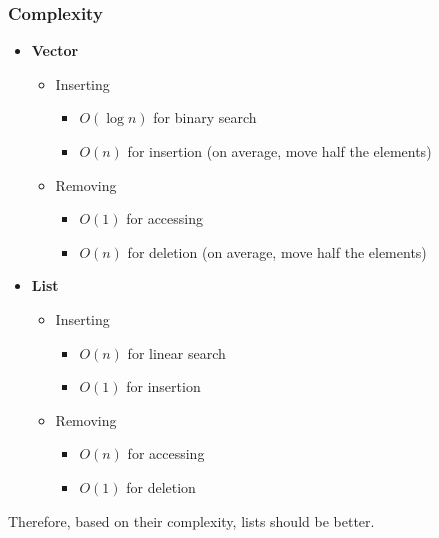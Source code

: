 \begin{frame}
  \frametitle{Complexity}
  
  \begin{itemize}
    \item {\bf Vector}
      \begin{itemize}
        \item Inserting
          \begin{itemize}
            \item $O(\log n)$ for binary search
            \item $O(n)$ for insertion (on average, move half the elements)
          \end{itemize}
        \item Removing
          \begin{itemize}
            \item $O(1)$ for accessing
            \item $O(n)$ for deletion (on average, move half the elements)
          \end{itemize}
      \end{itemize}

    \item {\bf List}
      \begin{itemize}
        \item Inserting
          \begin{itemize}
            \item $O(n)$ for linear search
            \item $O(1)$ for insertion
          \end{itemize}
        \item Removing
          \begin{itemize}
            \item $O(n)$ for accessing
            \item $O(1)$ for deletion
          \end{itemize}
      \end{itemize}
  \end{itemize}
  \vfill
  Therefore, based on their complexity, lists should be better.
\end{frame}

